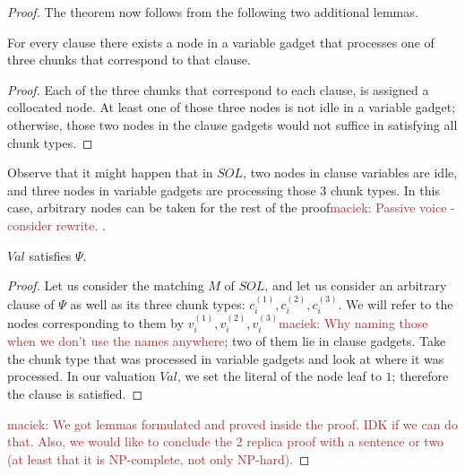 \documentclass[9pt]{sigcomm-alternate}
\newcommand{\maciek}[1]{\textcolor{brown}{maciek: #1}}
\newcommand{\achunk}{\ensuremath{c}}
\newcommand{\Formula}{\ensuremath{\Psi}}
\newcommand{\Val}{\ensuremath{Val}}
\newcommand{\Sol}{\ensuremath{SOL}}
\begin{document}
\begin{appendix}
\begin{proof}
The theorem now follows from the following two additional lemmas.
\begin{lemma}
For every clause there exists a node in a variable gadget that processes one of
  three chunks that correspond to that clause.
\end{lemma}
\begin{proof}
 Each of the three chunks that correspond to each clause,
 is assigned a collocated node.
 At least one of those three nodes is not idle in a variable gadget;
otherwise, those two nodes in the clause gadgets would not suffice in
satisfying all chunk types.
\end{proof}

Observe that it might happen that in $\Sol$, two nodes in
clause variables are idle, and three nodes in variable gadgets are
processing those $3$ chunk types. In this case,
arbitrary nodes can be taken for the rest
of the proof\maciek{Passive voice - consider rewrite.}
.

\begin{lemma}
$\Val$ satisfies $\Formula$.
\end{lemma}
\begin{proof}
Let us consider the matching $M$ of $\Sol$, and let us consider an arbitrary clause of
$\Formula$ as well as its three chunk types: $\achunk_i^{(1)}, \achunk_i^{(2)}, \achunk_i^{(3)}$.
We will refer to the nodes corresponding to them
by $v_i^{(1)}, v_i^{(2)}, v_i^{(3)}$\maciek{Why naming those when we don't use the names anywhere}; two of them lie in clause gadgets.
Take the chunk type that was processed in variable
gadgets and look at where it was processed.
In our valuation $\Val$, we set the literal of the node leaf to
$1$; therefore the clause is satisfied.
\end{proof}

\maciek{We got lemmas formulated and proved inside the proof. IDK if we can do that. Also, we would like to conclude the 2 replica proof with a sentence or two (at least that it is NP-complete, not only NP-hard).}
\end{proof}


\end{appendix}
\end{document}
